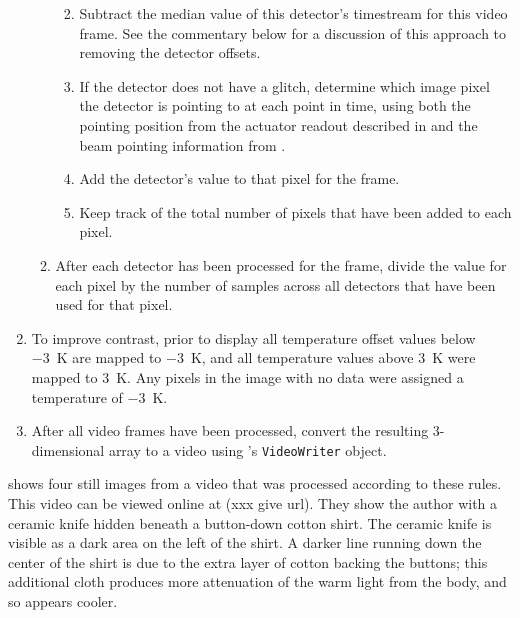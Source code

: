 \begin{enumerate}
\begin{enumerate}
\begin{enumerate}
\begin{enumerate}
      \end{enumerate}
    \item Subtract the median value of this detector's timestream for this video frame.
          See the commentary below for a discussion of this approach to removing the detector offsets.
    \item If the detector does not have a glitch, determine which image pixel the detector is pointing to at each point in time, using both the pointing position from the actuator readout described in  and the beam pointing information from .
    \item Add the detector's value to that pixel for the frame.
    \item Keep track of the total number of pixels that have been added to each pixel.
    \end{enumerate}
  \item After each detector has been processed for the frame, divide the value for each pixel by the number of samples across all detectors that have been used for that pixel.
  \end{enumerate}
  \item To improve contrast, prior to display all temperature offset values below \SI{-3}{\K} are mapped to \SI{-3}{\K}, and all temperature values above \SI{3}{\K} were mapped to \SI{3}{\K}.
        Any pixels in the image with no data were assigned a temperature of \SI{-3}{\K}.
  \item After all video frames have been processed, convert the resulting 3-dimensional array to a video using \MATLAB's \texttt{VideoWriter} object.
\end{enumerate}


 shows four still images from a video that was processed according to these rules.
This video can be viewed online at (xxx give url).
They show the author with a ceramic knife hidden beneath a button-down cotton shirt.
The ceramic knife is visible as a dark area on the left of the shirt.
A darker line running down the center of the shirt is due to the extra layer of cotton backing the buttons; this additional cloth produces more attenuation of the warm light from the body, and so appears cooler.

